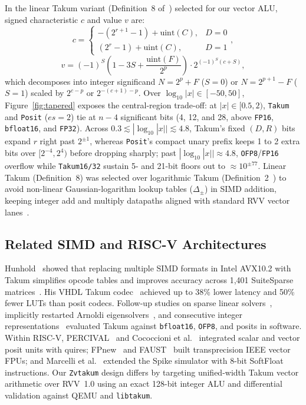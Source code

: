\documentclass[conference]{IEEEtran}
\begin{document}
In the linear Takum variant (Definition~8 of~\cite{hunhold2024takum}) selected for our vector ALU, signed characteristic $c$ and value $v$ are:
\begin{equation}
    c = \begin{cases} -(2^{r+1}-1) + \mathrm{uint}(C), & D = 0 \\ (2^r - 1) + \mathrm{uint}(C), & D = 1 \end{cases},
\end{equation}
\begin{equation}
    v = (-1)^S \left(1 - 3S + \frac{\mathrm{uint}(F)}{2^p}\right) \cdot 2^{(-1)^S (c + S)},
\end{equation}
which decomposes into integer significand $N = 2^p + F$ ($S=0$) or $N = 2^{p+1} - F$ ($S=1$) scaled by $2^{c-p}$ or $2^{-(c+1)-p}$. Over $\log_{10}|x|\in[-50,50]$, Figure~\ref{fig:tapered} exposes the central-region trade-off: at $|x|\in[0.5,2)$, \texttt{Takum} and \texttt{Posit} ($es=2$) tie at $n-4$ significant bits (4, 12, and 28, above \texttt{FP16}, \texttt{bfloat16}, and \texttt{FP32}). Across $0.3\lesssim|\log_{10}|x||\lesssim 4.8$, Takum's fixed $(D,R)$ bits expand $r$ right past $2^{\pm 1}$, whereas \texttt{Posit}'s compact unary prefix keeps 1 to 2 extra bits over $[2^{-4},2^4)$ before dropping sharply; past $|\log_{10}|x||\approx 4.8$, \texttt{OFP8}/\texttt{FP16} overflow while \texttt{Takum16/32} sustain 5- and 21-bit floors out to $\approx 10^{\pm 77}$. Linear Takum (Definition~8) was selected over logarithmic Takum (Definition~2~\cite{hunhold2024takum}) to avoid non-linear Gaussian-logarithm lookup tables ($\Delta_\pm$) in SIMD addition, keeping integer add and multiply datapaths aligned with standard RVV vector lanes~\cite{hunhold2025avx102}.

\subsection{Related SIMD and RISC-V Architectures}
Hunhold~\cite{hunhold2025avx102} showed that replacing multiple SIMD formats in Intel AVX10.2 with Takum simplifies opcode tables and improves accuracy across 1,401 SuiteSparse matrices~\cite{davis2011suitesparse,mufolab}. His VHDL Takum codec~\cite{hunhold2024vhdl} achieved up to 38\% lower latency and 50\% fewer LUTs than posit codecs. Follow-up studies on sparse linear solvers~\cite{hunhold2025solvers}, implicitly restarted Arnoldi eigensolvers~\cite{hunhold2025arnoldi}, and consecutive integer representations~\cite{hunhold2025integers} evaluated Takum against \texttt{bfloat16}, \texttt{OFP8}, and posits in software. Within RISC-V, PERCIVAL~\cite{mallasen2022percival} and Cococcioni et al.~\cite{cococcioni2021vectorizing} integrated scalar and vector posit units with quires; FPnew~\cite{mach2020fpnew} and FAUST~\cite{kovac2023faust} built transprecision IEEE vector FPUs; and Marcelli et al.~\cite{marcelli2025fp8spike} extended the Spike simulator with 8-bit SoftFloat instructions. Our \texttt{Zvtakum} design differs by targeting unified-width Takum vector arithmetic over RVV~1.0 using an exact 128-bit integer ALU and differential validation against QEMU and \texttt{libtakum}.
\end{document}
